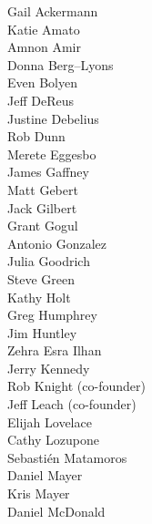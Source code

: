 \documentclass[10pt,letterpaper]{article}
\begin{document}
\parbox[t]{0.17\textwidth}{
\scriptsize{
Gail Ackermann\\
Katie Amato\\
Amnon Amir\\
Donna Berg--Lyons\\
Even Bolyen\\
Jeff DeReus\\
Justine Debelius\\
Rob Dunn\\
Merete Eggesbo\\
James Gaffney\\
Matt Gebert\\
Jack Gilbert\\
Grant Gogul\\
Antonio Gonzalez\\
Julia Goodrich\\
Steve Green\\
Kathy Holt\\
Greg Humphrey\\
Jim Huntley\\
Zehra Esra Ilhan\\
Jerry Kennedy\\
Rob Knight (co-founder)\\
Jeff Leach (co-founder)\\
Elijah Lovelace\\
Cathy Lozupone\\
Sebasti\'en Matamoros\\
Daniel Mayer\\
Kris Mayer\\
Daniel McDonald\\
}
}
\hspace{1mm}
\end{document}
